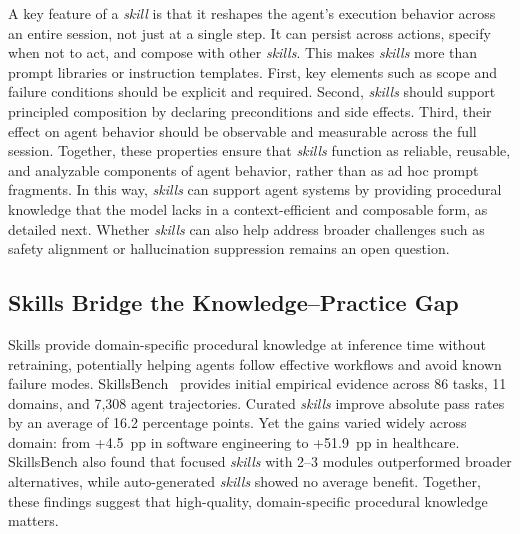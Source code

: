 \documentclass[sigconf,nonacm]{acmart}
\begin{document}
A key feature of a \emph{skill} is that it reshapes the agent's execution behavior across an entire session, not just at a single step. It can persist across actions, specify when not to act, and compose with other \emph{skills}. This makes \emph{skills} more than prompt libraries or instruction templates.  First, key elements such as scope and failure conditions should be explicit and required. Second, \emph{skills} should support principled composition by declaring preconditions and side effects. Third, their effect on agent behavior should be observable and measurable across the full session.
Together, these properties ensure that \emph{skills} function as reliable, reusable, and analyzable components of agent behavior, rather than as ad hoc prompt fragments.
In this way, \emph{skills} can support agent systems by providing procedural knowledge that the model lacks in a context-efficient and composable form, as detailed next.
Whether \emph{skills} can also help address broader challenges such as safety alignment or hallucination suppression remains an open question.

\vspace{-4pt}
\subsection{Skills Bridge the Knowledge--Practice Gap}
\label{sec:skills-gap}

Skills provide domain-specific procedural knowledge at inference time without retraining, potentially helping agents follow effective workflows and avoid known failure modes. SkillsBench~\cite{skillsbench2026} provides initial empirical evidence across 86 tasks, 11 domains, and 7,308 agent trajectories. Curated \emph{skills} improve absolute pass rates by an average of 16.2 percentage points. Yet the gains varied widely across domain: from +4.5~pp in software engineering to  +51.9~pp in healthcare. %
SkillsBench also found that focused \emph{skills} with 2--3 modules outperformed broader alternatives, while auto-generated \emph{skills} showed no average benefit. 
Together, these findings suggest that high-quality, domain-specific procedural knowledge matters.
\end{document}
